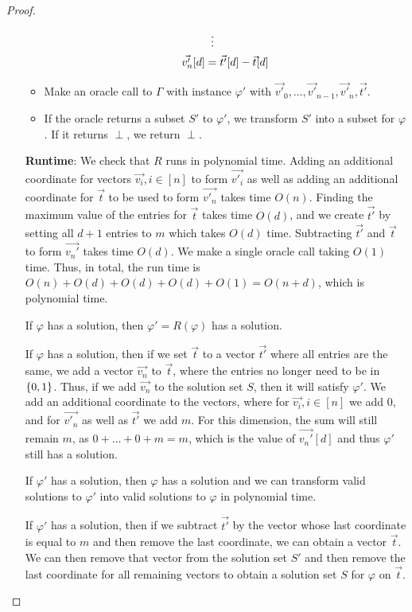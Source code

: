 \documentclass[11pt]{scrartcl}
\theoremstyle{dotlessP}
\theoremstyle{dotlessN}
\DeclarePairedDelimiter\set{\{}{\}}
\begin{document}
\begin{proof}
\begin{enumerate}[1.]
\begin{itemize}
\begin{align*}
						&\vdotswithin{ = } \\
						\vec{v'_n}[d] &= \vec{t'}[d] - \vec{t}[d]
					\end{align*}
		\item Make an oracle call to $\Gamma$ with instance $\varphi'$ with $\vec{v'}_0, \dots, \vec{v'}_{n-1}, \vec{v'}_n, \vec{t'}$.
		\item If the oracle returns a subset $S'$ to $\varphi'$, we transform $S'$ into a subset for $\varphi$. If it returns $\perp$, we return $\perp$.
			\end{itemize}
			\textbf{Runtime}: We check that $R$ runs in polynomial time. Adding an additional coordinate for vectors $\vec{v_i}, i \in [n]$ to form $\vec{v'_i}$ as well as adding an additional coordinate for $\vec{t}$ to be used to form $\vec{v'_n}$ takes time $O(n)$. Finding the maximum value of the entries for  $\vec{t}$ takes time $O(d)$, and we create $\vec{t'}$ by setting all $d+1$ entries to $m$ which takes $O(d)$ time. Subtracting $\vec{t'}$ and  $\vec{t}$ to form  $\vec{v_n'}$ takes time $O(d)$. We make a single oracle call taking $O(1)$ time. Thus, in total, the run time is $O(n) + O(d) + O(d) + O(d) + O(1) = O(n + d)$, which is polynomial time.
			\begin{claim*}
				If $\varphi$ has a solution, then $\varphi' = R(\varphi)$ has a solution.
			\end{claim*}
			\begin{subproof}
				If $\varphi$ has a solution, then if we set $\vec{t}$ to a vector $\vec{t'}$ where all entries are the same, we add a vector $\vec{v_n}$ to $\vec{t}$, where the entries no longer need to be in $\set*{0,1}$. Thus, if we add $\vec{v_n}$ to the solution set $S$, then it will satisfy $\varphi'$. We add an additional coordinate to the vectors, where for $\vec{v_i}, i \in [n]$ we add 0, and for $\vec{v'_n}$ as well as $\vec{t'}$ we add $m$. For this dimension, the sum will still remain $m$, as $0 + \dots + 0 + m = m$, which is the value of $\vec{v_n'}[d]$ and thus $\varphi'$ still has a solution.
			\end{subproof}
			\begin{claim*}
				If $\varphi'$ has a solution, then $\varphi$ has a solution and we can transform valid solutions to $\varphi'$ into valid solutions to $\varphi$ in polynomial time.
			\end{claim*}
			\begin{subproof}
				If $\varphi'$ has a solution, then if we subtract $\vec{t'}$ by the vector whose last coordinate is equal to $m$ and then remove the last coordinate, we can obtain a vector $\vec{t}$. We can then remove that vector from the solution set $S'$ and then remove the last coordinate for all remaining vectors to obtain a solution set $S$ for $\varphi$ on $\vec{t}$.


\end{subproof}
\end{enumerate}
\end{proof}
\end{document}
